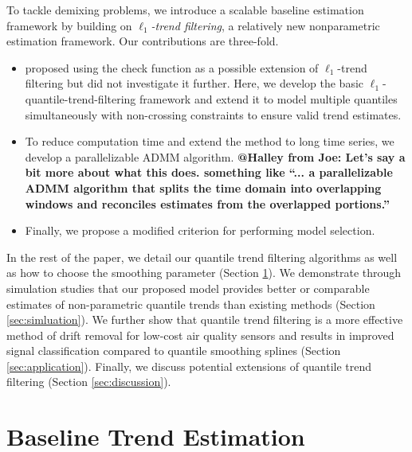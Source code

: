 \documentclass[12pt]{article}
\makeatletter
\newcommand{\Halley}[2]{{\bf {\color{purple}@Halley from #1: #2}}\xspace}
\makeatother
\begin{document}
To tackle demixing problems, we introduce a scalable baseline estimation framework by building on \textit{$\ell_1$-trend filtering}, a relatively new nonparametric estimation framework. Our contributions are three-fold.
\begin{itemize}
\item \cite{Kim2009} proposed using the check function as a possible extension of $\ell_1$-trend filtering but did not investigate it further. Here, we develop the basic $\ell_1$-quantile-trend-filtering framework and extend it to model multiple quantiles simultaneously with non-crossing constraints to ensure valid trend estimates.
\item To reduce computation time and extend the method to long time series, we develop a parallelizable ADMM algorithm. \Halley{Joe}{Let's say a bit more about what this does. something like ``... a parallelizable ADMM algorithm that splits the time domain into overlapping windows and reconciles estimates from the overlapped portions.''}
\item Finally, we propose a modified criterion for performing model selection.
\end{itemize}

	In the rest of the paper, we detail our quantile trend filtering algorithms as well as how to choose the smoothing parameter (Section \ref{sec:methods}). We demonstrate through simulation studies that our proposed model provides better or comparable estimates of non-parametric quantile trends than existing methods (Section \ref{sec:simluation}). We further show that quantile trend filtering is a more effective method of drift removal for low-cost air quality sensors and results in improved signal classification compared to quantile smoothing splines (Section \ref{sec:application}). Finally, we discuss potential extensions of quantile trend filtering (Section \ref{sec:discussion}).

\section{Baseline Trend Estimation}
\label{sec:methods}

\end{document}
